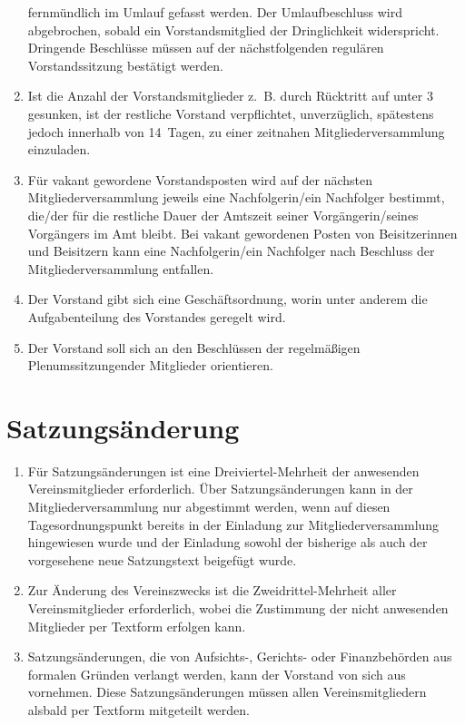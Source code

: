\documentclass[a4paper,12pt]{scrartcl}
\begin{document}
\begin{enumerate}
    fernmündlich im Umlauf gefasst werden. Der Umlaufbeschluss 
    wird abgebrochen, sobald ein Vorstandsmitglied der Dringlichkeit
    widerspricht. Dringende Beschlüsse müssen auf der nächstfolgenden regulären
    Vorstandssitzung bestätigt werden. 
  \item Ist die Anzahl der Vorstandsmitglieder z.~B. durch Rücktritt auf unter 3
    gesunken, ist der restliche Vorstand verpflichtet, unverzüglich, spätestens
    jedoch innerhalb von 14~Tagen, zu einer zeitnahen Mitgliederversammlung
    einzuladen.
  \item Für vakant gewordene Vorstandsposten wird auf der nächsten
    Mitgliederversammlung jeweils eine Nachfolgerin/ein Nachfolger bestimmt, 
    die/der für die restliche Dauer der Amtszeit seiner Vorgängerin/seines
    Vorgängers im Amt bleibt. Bei vakant gewordenen Posten von Beisitzerinnen
    und Beisitzern kann eine Nachfolgerin/ein Nachfolger nach Beschluss der 
    Mitgliederversammlung entfallen.
  \item Der Vorstand gibt sich eine Geschäftsordnung, worin unter anderem die
    Aufgabenteilung des Vorstandes geregelt wird.
  \item Der Vorstand soll sich an den Beschlüssen der regelmäßigen 
    Plenumssitzungender Mitglieder orientieren.
\end{enumerate}

\section{Satzungsänderung}
\begin{enumerate}
  \item Für Satzungsänderungen ist eine Dreiviertel-Mehrheit der anwesenden
    Vereinsmitglieder erforderlich. Über Satzungsänderungen kann in der
    Mitgliederversammlung nur abgestimmt werden, wenn auf diesen
    Tagesordnungspunkt bereits in der Einladung zur Mitgliederversammlung
    hingewiesen wurde und der Einladung sowohl der bisherige als auch der
    vorgesehene neue Satzungstext beigefügt wurde.
  \item Zur Änderung des Vereinszwecks ist die Zweidrittel-Mehrheit aller
    Vereinsmitglieder erforderlich, wobei die Zustimmung der nicht anwesenden
    Mitglieder per Textform erfolgen kann.
  \item Satzungsänderungen, die von Aufsichts-, Gerichts- oder Finanzbehörden
    aus formalen Gründen verlangt werden, kann der Vorstand von sich aus
    vornehmen. Diese Satzungsänderungen müssen allen Vereinsmitgliedern
    alsbald per Textform mitgeteilt werden.
\end{enumerate}
\end{document}
